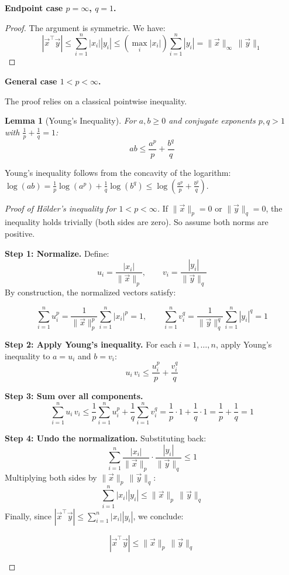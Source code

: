 \documentclass[10pt, twocolumn]{article}
\theoremstyle{definition}
\theoremstyle{plain}
\newtheorem{lemma}[theorem]{Lemma}
\begin{document}
\textbf{Endpoint case $p = \infty$, $q = 1$.}

\begin{proof}
The argument is symmetric. We have:
\[
    |\vec{x}^\top \vec{y}| \le \sum_{i=1}^{n} |x_i| |y_i| \le \left(\max_i |x_i|\right) \sum_{i=1}^{n} |y_i| = \|\vec{x}\|_\infty \, \|\vec{y}\|_1
\]
\end{proof}

\textbf{General case $1 < p < \infty$.}

The proof relies on a classical pointwise inequality.

\begin{tcolorbox}
\begin{lemma}[Young's Inequality]
For $a, b \ge 0$ and conjugate exponents $p, q > 1$ with $\frac{1}{p} + \frac{1}{q} = 1$:
\[
    ab \le \frac{a^p}{p} + \frac{b^q}{q}
\]
\end{lemma}
\end{tcolorbox}

Young's inequality follows from the concavity of the logarithm: $\log(ab) = \frac{1}{p}\log(a^p) + \frac{1}{q}\log(b^q) \le \log\!\left(\frac{a^p}{p} + \frac{b^q}{q}\right)$.

\begin{proof}[Proof of H\"{o}lder's inequality for $1 < p < \infty$]
If $\|\vec{x}\|_p = 0$ or $\|\vec{y}\|_q = 0$, the inequality holds trivially (both sides are zero). So assume both norms are positive.

\textbf{Step 1: Normalize.} Define:
\[
    u_i = \frac{|x_i|}{\|\vec{x}\|_p}, \qquad v_i = \frac{|y_i|}{\|\vec{y}\|_q}
\]
By construction, the normalized vectors satisfy:
\begin{result}
\[
    \sum_{i=1}^{n} u_i^p = \frac{1}{\|\vec{x}\|_p^p} \sum_{i=1}^{n} |x_i|^p = 1, \qquad \sum_{i=1}^{n} v_i^q = \frac{1}{\|\vec{y}\|_q^q} \sum_{i=1}^{n} |y_i|^q = 1
\]
\end{result}

\textbf{Step 2: Apply Young's inequality.} For each $i = 1, \ldots, n$, apply Young's inequality to $a = u_i$ and $b = v_i$:
\[
    u_i \, v_i \le \frac{u_i^p}{p} + \frac{v_i^q}{q}
\]

\textbf{Step 3: Sum over all components.}
\[
    \sum_{i=1}^{n} u_i \, v_i \le \frac{1}{p} \sum_{i=1}^{n} u_i^p + \frac{1}{q} \sum_{i=1}^{n} v_i^q = \frac{1}{p} \cdot 1 + \frac{1}{q} \cdot 1 = \frac{1}{p} + \frac{1}{q} = 1
\]

\textbf{Step 4: Undo the normalization.} Substituting back:
\[
    \sum_{i=1}^{n} \frac{|x_i|}{\|\vec{x}\|_p} \cdot \frac{|y_i|}{\|\vec{y}\|_q} \le 1
\]
Multiplying both sides by $\|\vec{x}\|_p \, \|\vec{y}\|_q$:
\[
    \sum_{i=1}^{n} |x_i| |y_i| \le \|\vec{x}\|_p \, \|\vec{y}\|_q
\]
Finally, since $|\vec{x}^\top \vec{y}| \le \sum_{i=1}^{n} |x_i| |y_i|$, we conclude:
\begin{result}
\[
    |\vec{x}^\top \vec{y}| \le \|\vec{x}\|_p \, \|\vec{y}\|_q
\]
\end{result}
\end{proof}
\end{document}
